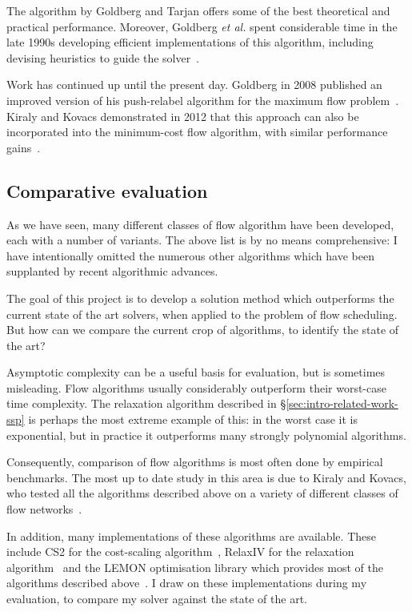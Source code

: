 The algorithm by Goldberg and Tarjan offers some of the best theoretical and practical performance. Moreover, Goldberg \textit{et al.} spent considerable time in the late 1990s developing efficient implementations of this algorithm, including devising heuristics to guide the solver~\cite{Goldberg:1997,Bunnagel:1998}.

Work has continued up until the present day. Goldberg in 2008 published an improved version of his push-relabel algorithm for the maximum flow problem~\cite{Goldberg:2008}. Kiraly and Kovacs demonstrated in 2012 that this approach can also be incorporated into the minimum-cost flow algorithm, with similar performance gains~\cite{KiralyKovacs:2012}.

\subsection{Comparative evaluation}

As we have seen, many different classes of flow algorithm have been developed, each with a number of variants. The above list is by no means comprehensive: I have intentionally omitted the numerous other algorithms which have been supplanted by recent algorithmic advances.

The goal of this project is to develop a solution method which outperforms the current state of the art solvers, when applied to the problem of flow scheduling. But how can we compare the current crop of algorithms, to identify the state of the art? 

Asymptotic complexity can be a useful basis for evaluation, but is sometimes misleading. Flow algorithms usually considerably outperform their worst-case time complexity. The relaxation algorithm described in \S\ref{sec:intro-related-work-ssp} is perhaps the most extreme example of this: in the worst case it is exponential, but in practice it outperforms many strongly polynomial algorithms.

Consequently, comparison of flow algorithms is most often done by empirical benchmarks. The most up to date study in this area is due to Kiraly and Kovacs, who tested all the algorithms described above on a variety of different classes of flow networks~\cite{KiralyKovacs:2012,Kovacs:2015}.

In addition, many implementations of these algorithms are available. These include CS2 for the cost-scaling algorithm~\cite{CS2:2009}, RelaxIV for the relaxation algorithm~\cite{RelaxIV:2011} and the LEMON optimisation library which provides most of the algorithms described above~\cite{LEMON:2011,LEMON:Software}. I draw on these implementations during my evaluation, to compare my solver against the state of the art.